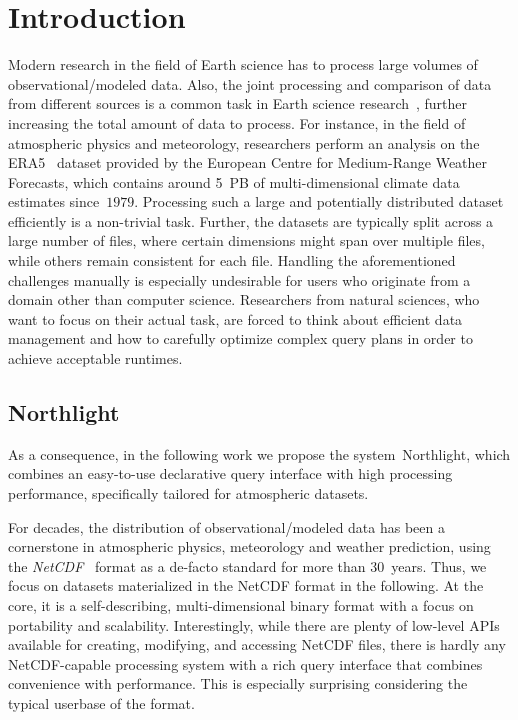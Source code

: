 \documentclass[conference]{IEEEtran}
\newcommand{\system}{Northlight}
\begin{document}
\section{Introduction}
\label{sec:intro}

Modern research in the field of Earth science has to process large volumes of observational/modeled data. Also, the joint processing and comparison of data from different sources is a common task in Earth science research~\cite{lit:rhi, Gierens:1999tf}, further increasing the total amount of data to process. For instance, in the field of atmospheric physics and meteorology, researchers perform an analysis on the ERA5~\cite{lit:ecmwf-era5,lit:era5} dataset provided by the European Centre for Medium-Range Weather Forecasts, which contains around 5~PB of multi-dimensional climate data estimates since~$1979$. Processing such a large and potentially distributed dataset efficiently is a non-trivial task.
Further, the datasets are typically split across a large number of files, where certain dimensions might span over multiple files, while others remain consistent for each file.  
Handling the aforementioned challenges manually is especially undesirable for users who originate from a domain other than computer science. Researchers from natural sciences, who want to focus on their actual task, are forced to think about efficient data management and how to carefully optimize complex query plans in order to achieve acceptable runtimes. 

\subsection{\system{}}

As a consequence, in the following work we propose the system~\system{}, which combines an easy-to-use declarative query interface with high processing performance, specifically tailored for atmospheric datasets. 

For decades, the distribution of observational/modeled data has been a cornerstone in atmospheric physics, meteorology and weather prediction, using the \textit{NetCDF}~\cite{lit:netcdf} format as a de-facto standard for more than $30$~years. Thus, we focus on datasets materialized in the NetCDF format in the following.
At the core, it is a self-describing, multi-dimensional binary format with a focus on portability and scalability. Interestingly, while there are plenty of low-level APIs available for creating, modifying, and accessing NetCDF files, there is hardly any NetCDF-capable processing system with a rich query interface that combines convenience with performance. This is especially surprising considering the typical userbase of the format.
\end{document}
